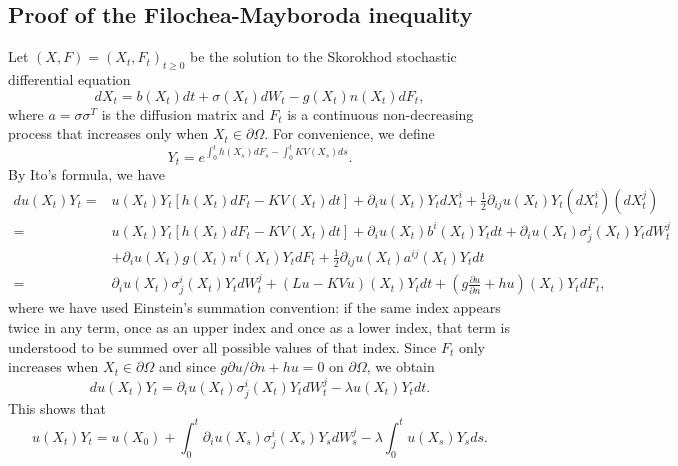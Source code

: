 \documentclass[a4paper,11pt]{article}
\begin{document}
\begin{appendices}

\section{Proof of the Filochea-Mayboroda inequality}\label{appA}
Let $(X, F) = (X_t,F_t)_{t\geq 0}$ be the solution to the Skorokhod stochastic differential equation
\begin{equation*}
d X_t = b(X_t) dt + \sigma(X_t) d W_t - g(X_t) n(X_t) d F_t,
\end{equation*}
where $a = \sigma\sigma^T$ is the diffusion matrix and $F_t$ is a continuous non-decreasing process that increases only when $X_t \in \partial \Omega$. For convenience, we define
\begin{equation*}
Y_t = e^{\int_{0}^{t} h(X_s) d F_s - \int_{0}^{t} K V(X_s) ds}.
\end{equation*}
By Ito's formula, we have
\begin{equation*}
\begin{split}
du(X_t) Y_t = & u(X_t) Y_t [h(X_t) dF_t - K V(X_t) dt] + \partial_i u(X_t) Y_t dX^i_t + \frac{1}{2} \partial_{ij} u(X_t) Y_t (dX^i_t) (dX^j_t) \\
= & u(X_t) Y_t [h(X_t) dF_t - K V(X_t) dt] + \partial_i u(X_t) b^i(X_t) Y_t dt + \partial_i u(X_t) \sigma^i_j(X_t) Y_t dW^j_t \\
& + \partial_i u(X_t) g(X_t) n^i(X_t) Y_t dF_t + \frac{1}{2} \partial_{ij} u(X_t) a^{ij}(X_t) Y_t dt\\
= & \partial_i u(X_t) \sigma^i_j(X_t) Y_t dW^j_t + (L u - K V u) (X_t) Y_t dt
+\left( g \frac{\partial u}{\partial n} + h u \right) (X_t) Y_t dF_t,
\end{split}
\end{equation*}
where we have used Einstein's summation convention: if the same index appears twice in any term, once as an upper index and once as a lower index, that term is understood to be summed over all possible values of that index. Since $F_t$ only increases when $X_t \in \partial \Omega$ and since $g \partial u/\partial n + h u = 0$ on $\partial \Omega$, we obtain
\begin{equation*}
du(X_t) Y_t = \partial_i u(X_t) \sigma^i_j(X_t) Y_t dW^j_t - \lambda u(X_t) Y_tdt.
\end{equation*}
This shows that
\begin{equation*}
u(X_t)Y_t = u(X_0) + \int_0^t \partial_i u(X_s) \sigma^i_j(X_s) Y_s dW^j_s - \lambda \int_0^t u(X_s) Y_s ds.
\end{equation*}

\end{appendices}
\end{document}
